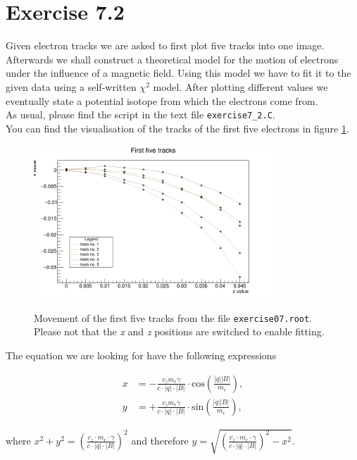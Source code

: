 \documentclass[10pt]{article}
\newenvironment{myfont}{\fontfamily{put}\selectfont}{\par}
\begin{document}
\begin{myfont}
\section*{Exercise 7.2}

Given electron tracks we are asked to first plot five tracks into one image.
Afterwards we shall construct a theoretical model for the motion of electrons under the influence of a magnetic field.
Using this model we have to fit it to the given data using a self-written $\chi^{2}$ model.
After plotting different values we eventually state a potential isotope from which the electrons come from. \\

\noindent As usual, please find the script in the text file \texttt{exercise7\_2.C}. \\
You can find the visualisation of the tracks of the first five electrons in figure \ref{fig:ex7_2_tracks}.

\begin{figure}[h]
  \centering
  \caption{Movement of the first five tracks from the file \texttt{exercise07.root}.
  Please not that the \textit{x} and \textit{z} positions are switched to enable fitting.}
  \includegraphics[width = 0.8\textwidth]{./tracks.png}
  \label{fig:ex7_2_tracks}
\end{figure}

\noindent The equation we are looking for have the following expressions

\begin{align}
x  & = - \frac{v_{z} m_{e} \gamma}{c \cdot |q| \cdot |B|} \cdot \textrm{cos}\left(\frac{|q||B|}{m_{e}}\right), \\
y  & = + \frac{v_{z} m_{e} \gamma}{c \cdot |q| \cdot |B|} \cdot \textrm{sin}\left(\frac{|q||B|}{m_{e}}\right),
\end{align}

\noindent where $x^{2} + y^{2} = \left(\frac{v_{z} \cdot m_{e} \cdot \gamma}{c \cdot |q| \cdot |B|}\right)^{2}$ and therefore $y = \sqrt{\left(\frac{v_{z} \cdot m_{e} \cdot \gamma}{c \cdot |q| \cdot |B|}\right)^{2} - x^{2}}$. \\


\end{myfont}
\end{document}
